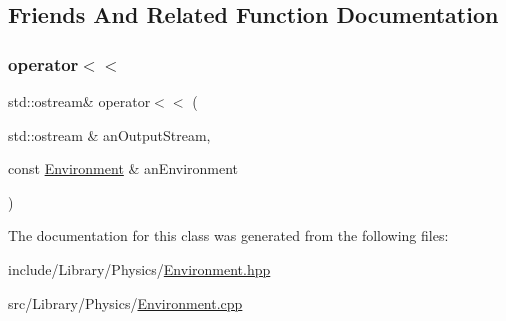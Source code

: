 \subsection{Friends And Related Function Documentation}
\mbox{\label{classlibrary_1_1physics_1_1_environment_a7bc4b39898452fbe5ce3a8de75ad2596}} 
\subsubsection{\texorpdfstring{operator$<$$<$}{operator<<}}
{\footnotesize\ttfamily std\+::ostream\& operator$<$$<$ (\begin{DoxyParamCaption}\item[{std\+::ostream \&}]{an\+Output\+Stream,  }\item[{const \hyperlink{classlibrary_1_1physics_1_1_environment}{Environment} \&}]{an\+Environment }\end{DoxyParamCaption})\hspace{0.3cm}{\ttfamily [friend]}}



The documentation for this class was generated from the following files\+:\begin{DoxyCompactItemize}
\item 
include/\+Library/\+Physics/\hyperlink{_environment_8hpp}{Environment.\+hpp}\item 
src/\+Library/\+Physics/\hyperlink{_environment_8cpp}{Environment.\+cpp}\end{DoxyCompactItemize}
